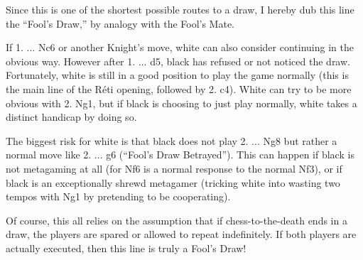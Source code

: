\documentclass[twocolumn]{article}
\begin{document}
{  Since this is one of the shortest possible routes to a draw, I hereby
  dub this line the ``Fool's Draw,'' by analogy with the Fool's Mate.

  If 1. ... Nc6 or another Knight's move, white can also consider
  continuing in the obvious way. However after 1. ... d5, black has
  refused or not noticed the draw. Fortunately, white is still in a
  good position to play the game normally (this is the main line of
  the R\'eti opening, followed by 2. c4). White can try to be more
  obvious with 2. Ng1, but if black is choosing to just play normally,
  white takes a distinct handicap by doing so.

  The biggest risk for white is that black does not play 2. ... Ng8
  but rather a normal move like 2. ... g6 (``Fool's Draw Betrayed'').
  This can happen if black is not metagaming at all (for Nf6 is a
  normal response to the normal Nf3), or if black is an exceptionally
  shrewd metagamer (tricking white into wasting two tempos with Ng1
  by pretending to be cooperating).

  Of course, this all relies on the assumption that if
  chess-to-the-death ends in a draw, the players are spared or allowed
  to repeat indefinitely. If both players are actually executed, then
  this line is truly a Fool's Draw!
}
%
\end{document}
